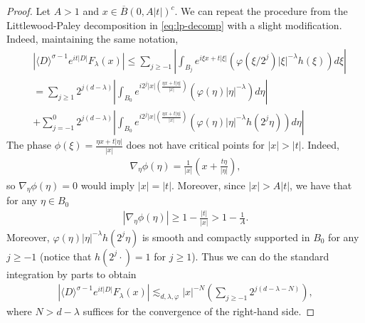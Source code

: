 \documentclass[a4paper, reqno, 11pt]{amsart}
\theoremstyle{definition}
\begin{document}
\begin{proof}
Let $A > 1$ and $x \in \overline{B}(0,A|t|)^c$. We can repeat the procedure from the Littlewood-Paley decomposition in \eqref{eq:lp-decomp} with a slight modification. Indeed, maintaining the same notation,
\begin{align*}
&|\langle D \rangle^{\sigma-1} e^{it|D|} F_{\lambda}(x)| \leq \sum_{j \geq -1} \left| \int_{B_j} e^{i \xi x + t |\xi|}(\varphi(\xi/2^j) |\xi|^{-\lambda} h(\xi)) d\xi \right| \nonumber \\
&= \sum_{j \geq 1} 2^{j(d-\lambda)} \left| \int_{B_0} e^{i 2^j |x| (\frac{\eta x + t |\eta|}{|x|})}(\varphi(\eta) |\eta|^{-\lambda} ) d\eta \right| \nonumber \\
&+ \sum_{j=-1}^0 2^{j(d-\lambda)} \left| \int_{B_0} e^{i 2^j |x| (\frac{\eta x + t |\eta|}{|x|})}(\varphi(\eta) |\eta|^{-\lambda} h(2^j \eta)) d\eta \right|
\end{align*}
The phase $\phi(\xi) = \frac{\eta x + t |\eta|}{|x|}$ does not have critical points for $|x| > |t|$. Indeed,
\begin{align*}
\nabla_{\eta} \phi(\eta) = \frac{1}{|x|} \left( x + \frac{t \eta}{|\eta|} \right),
\end{align*}
so $\nabla_{\eta} \phi(\eta) = 0$ would imply $|x| = |t|$. Moreover, since $|x| > A |t|$, we have that for any $\eta \in B_0$
\begin{align*}
|\nabla_{\eta} \phi(\eta)| \geq 1 - \frac{|t|}{|x|} > 1 - \frac{1}{A}.
\end{align*}
Moreover, $\varphi(\eta) |\eta|^{-\lambda} h(2^j \eta)$ is smooth and compactly supported in $B_0$ for any $j \geq -1$ (notice that $h(2^j \cdot) = 1$ for $j \geq 1$).  Thus we can do the standard integration by parts to obtain
\begin{align*}
|\langle D \rangle^{\sigma-1} e^{it|D|} F_{\lambda}(x)| \lesssim_{d,\lambda,\varphi} |x|^{-N} \left( \sum_{j \geq -1} 2^{j(d-\lambda-N)} \right),
\end{align*}
where $N > d - \lambda$ suffices for the convergence of the right-hand side. %


\end{proof}
\end{document}
